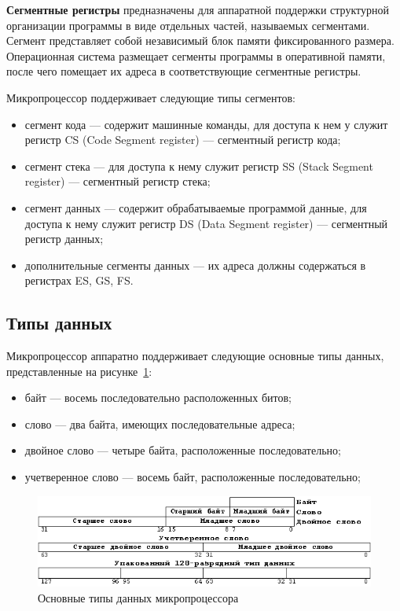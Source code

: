 \textbf{Сегментные регистры} предназначены для аппаратной поддержки структурной
организации программы в виде отдельных частей, называемых сегментами.
Сегмент представляет собой независимый блок памяти фиксированного размера.
Операционная система размещает сегменты программы в оперативной памяти,
после чего помещает их адреса в соответствующие сегментные регистры.

Микропроцессор поддерживает следующие типы сегментов:

\begin{itemize}
\item сегмент кода --- содержит машинные команды, для доступа к нем у служит регистр CS
  (Code Segment register) --- сегментный регистр кода;
\item сегмент стека --- для доступа к нему служит регистр SS (Stack Segment register) ---
  сегментный регистр стека;
\item сегмент данных --- содержит обрабатываемые программой данные, для доступа к нему
  служит регистр DS (Data Segment register) --- сегментный регистр данных;
\item
  дополнительные сегменты данных --- их адреса должны содержаться в регистрах ES, GS, FS.
\end{itemize}

\subsection{Типы данных}

Микропроцессор аппаратно поддерживает следующие основные типы данных, представленные
на рисунке~\ref{fig:sizes}:

\begin{itemize}
\item байт --- восемь последовательно расположенных битов;
\item слово --- два байта, имеющих последовательные адреса;
\item двойное слово --- четыре байта, расположенные последовательно;
\item учетверенное слово --- восемь байт, расположенные последовательно;
\end{itemize}

\begin{figure}[htbp]
  \centering
  \includegraphics[width=150mm]{pic/sizes}
  \caption{Основные типы данных микропроцессора}\label{fig:sizes}
\end{figure}


